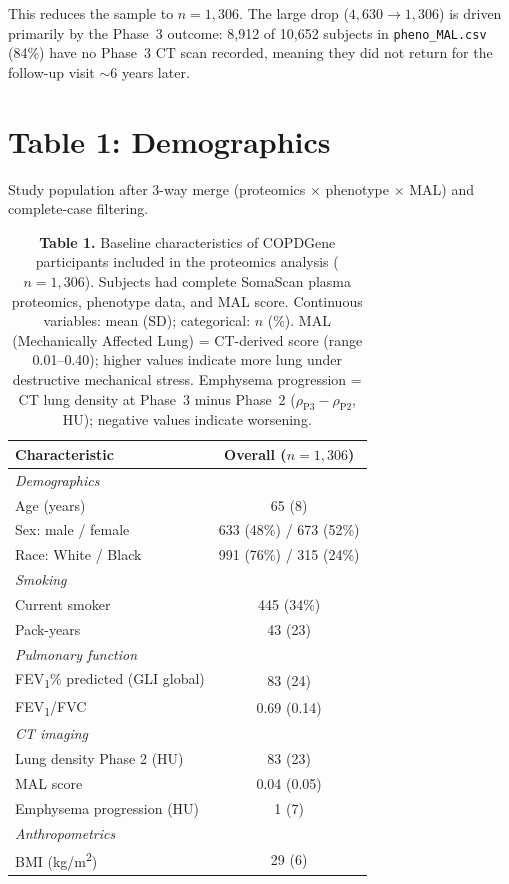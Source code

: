 \documentclass[11pt, letterpaper]{article}
\begin{document}
This reduces the sample to $n = 1{,}306$. The large drop
($4{,}630 \to 1{,}306$) is driven primarily by the Phase~3 outcome:
8,912 of 10,652 subjects in \texttt{pheno\_MAL.csv} (84\%) have no
Phase~3 CT scan recorded, meaning they did not return for the
follow-up visit $\sim$6 years later.

\bigskip
\section*{Table 1: Demographics}

\noindent Study population after 3-way merge (proteomics $\times$
phenotype $\times$ MAL) and complete-case filtering.

\begin{table}[H]
\centering
\caption*{\textbf{Table 1.} Baseline characteristics of COPDGene
  participants included in the proteomics analysis ($n = 1{,}306$).
  Subjects had complete SomaScan plasma proteomics, phenotype data, and
  MAL score. Continuous variables: mean (SD); categorical: $n$ (\%).
  MAL (Mechanically Affected Lung) = CT-derived score (range
  0.01--0.40); higher values indicate more lung under destructive
  mechanical stress. Emphysema progression = CT lung density at
  Phase~3 minus Phase~2 ($\rho_{\text{P3}} - \rho_{\text{P2}}$, HU);
  negative values indicate worsening.}
\begin{tabular}{lc}
\toprule
Characteristic & Overall ($n = 1{,}306$) \\
\midrule
\textit{Demographics} & \\
\quad Age (years)                         & 65 (8) \\
\quad Sex: male / female                  & 633 (48\%) / 673 (52\%) \\
\quad Race: White / Black                 & 991 (76\%) / 315 (24\%) \\
\addlinespace
\textit{Smoking} & \\
\quad Current smoker                      & 445 (34\%) \\
\quad Pack-years                          & 43 (23) \\
\addlinespace
\textit{Pulmonary function} & \\
\quad FEV\textsubscript{1}\% predicted (GLI global) & 83 (24) \\
\quad FEV\textsubscript{1}/FVC            & 0.69 (0.14) \\
\addlinespace
\textit{CT imaging} & \\
\quad Lung density Phase 2 (HU)           & 83 (23) \\
\quad MAL score                           & 0.04 (0.05) \\
\quad Emphysema progression (HU)          & 1 (7) \\
\addlinespace
\textit{Anthropometrics} & \\
\quad BMI (kg/m\textsuperscript{2})       & 29 (6) \\
\bottomrule
\end{tabular}
\end{table}
\end{document}
